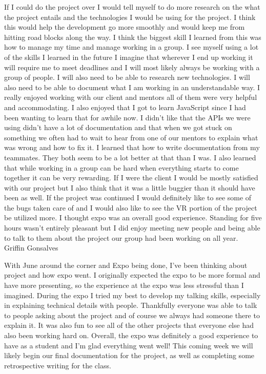 \documentclass[letterpaper, 10pt, draftclsnofoot, compsoc, onecolumn]{IEEEtran}
\begin{document}
If I could do the project over I would tell myself to do more research on the what the project entails and the technologies I would be using for the project. I think this would help the development go more smoothly and would keep me from hitting road blocks along the way. I think the biggest skill I learned from this was how to manage my time and manage working in a group. I see myself using a lot of the skills I learned in the future I imagine that wherever I end up working it will require me to meet deadlines and I will most likely always be working with a group of people. I will also need to be able to research new technologies. I will also need to be able to document what I am working in an understandable way. I really enjoyed working with our client and mentors all of them were very helpful and accommodating. I also enjoyed that I got to learn JavaScript since I had been wanting to learn that for awhile now. I didn't like that the APIs we were using didn't have a lot of documentation and that when we got stuck on something we often had to wait to hear from one of our mentors to explain what was wrong and how to fix it. I learned that how to write documentation from my teammates. They both seem to be a lot better at that than I was. I also learned that while working in a group can be hard when everything starts to come together it can be very rewarding. If I were the client I would be mostly satisfied with our project but I also think that it was a little buggier than it should have been as well. If the project was continued I would definitely like to see some of the bugs taken care of and I would also like to see the VR portion of the project be utilized more. I thought expo was an overall good experience. Standing for five hours wasn't entirely pleasant but I did enjoy meeting new people and being able to talk to them about the project our group had been working on all year.\\

Griffin Gonsalves

With June around the corner and Expo being done, I've been thinking about project and how expo went. I originally expected the expo to be more formal and have more presenting, so the experience at the expo was less stressful than I imagined. During the expo I tried my best to develop my talking skills, especially in explaining technical details with people. Thankfully everyone was able to talk to people asking about the project and of course we always had someone there to explain it. It was also fun to see all of the other projects that everyone else had also been working hard on. Overall, the expo was definitely a good experience to have as a student and I'm glad everything went well! This coming week we will likely begin our final documentation for the project, as well as completing some retrospective writing for the class.\\
\end{document}
